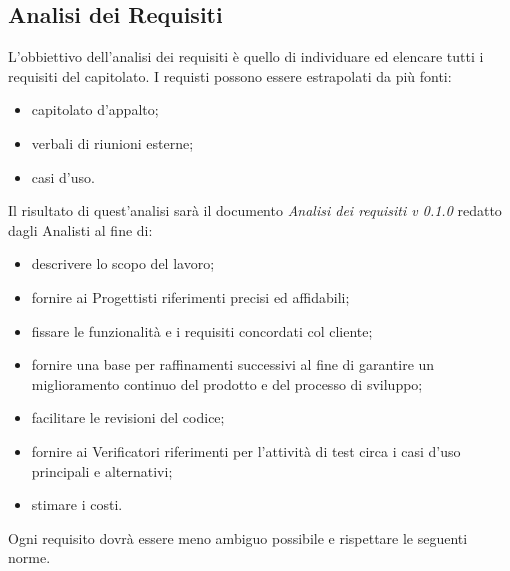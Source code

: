 \documentclass[NormeDiProgetto.tex]{subfiles}
\begin{document}
\subsection{Analisi dei Requisiti}
L'obbiettivo dell'analisi dei requisiti è quello di individuare ed elencare tutti i requisiti del capitolato. I requisti possono essere estrapolati da più fonti:
\begin{itemize}
	\item capitolato d’appalto;
	\item verbali di riunioni esterne;
	\item casi d’uso.
\end{itemize}
Il risultato di quest'analisi sarà il documento \textit{Analisi dei requisiti v 0.1.0} redatto dagli Analisti al
fine di:
\begin{itemize}
\item descrivere lo scopo del lavoro;
\item fornire ai Progettisti riferimenti precisi ed affidabili;
\item fissare le funzionalità e i requisiti concordati col cliente;
\item fornire una base per raffinamenti successivi al fine di garantire un
miglioramento continuo del prodotto e del processo di sviluppo;
\item facilitare le revisioni del codice;
\item fornire ai Verificatori riferimenti per l’attività di test circa i casi d’uso
principali e alternativi;
\item stimare i costi.
\end{itemize}
Ogni requisito dovrà
essere meno ambiguo possibile e rispettare le seguenti norme.
\end{document}
